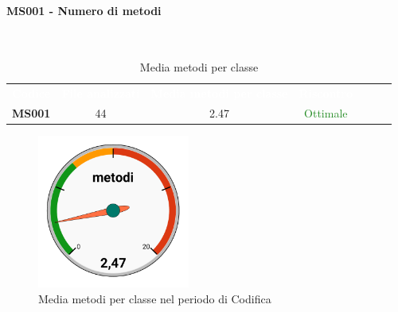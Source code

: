 \paragraph{MS001 - Numero di metodi}\mbox{}\\[0,3cm]
    \begin{table}[H]
        \centering
        \begin{tabular}{ccccccc}
            \rowcolor{greySWEight}
            \textcolor{white}{\textbf{Codice}} &
            \textcolor{white}{\textbf{File analizzati}}&
            \textcolor{white}{\textbf{Media metodi per classe}}&
            \textcolor{white}{\textbf{Riscontro}}\\
            \textbf{MS001} & 44 & 2.47 & \textcolor{ForestGreen}{Ottimale}\\
        \end{tabular}
        \caption{Media metodi per classe}
    \end{table}

    \begin{figure}[H]
        \centering
        \includegraphics[width=50mm]{sez/App_Esito/Qualifica/graph/numeroMetodiCruscotto.pdf}
        \caption{Media metodi per classe nel periodo di Codifica}
    \end{figure}

